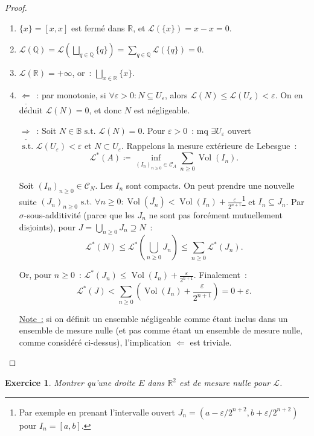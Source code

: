 \documentclass{article}
\newtheorem{ex}{Exercice}[section]
\newcommand{\pinfty}{{+\infty}}
\newcommand{\st}{\text{ s.t. }}
\newcommand{\Q}{{\mathbb Q}}
\newcommand{\R}{{\mathbb R}}
\newcommand{\B}{{\mathbb B}}
\DeclareMathOperator{\Vol}{Vol}
\begin{document}
\begin{proof}~
\begin{enumerate}
	\item $\{x\} = [x, x]$ est fermé dans $\R$, et $\mathcal L(\{x\}) = x-x = 0$.
	\item $\mathcal L(\Q) = \mathcal L(\bigsqcup_{q \in \Q}\{q\}) = \sum_{q \in \Q}\mathcal L(\{q\}) = 0$.
	\item $\mathcal L(\R) = \pinfty$, or~: $\bigsqcup_{x \in \R}\{x\}$.
	\item $\underline {\Leftarrow}$~: par monotonie, si $\forall \varepsilon > 0 : N \subseteq U_\varepsilon$, alors $\mathcal L(N) \leq \mathcal L(U_\varepsilon) < \varepsilon$.
	On en déduit $\mathcal L(N) = 0$, et donc $N$ est négligeable.

	$\underline {\Rightarrow}$~: Soit $N \in \B \st \mathcal L(N) = 0$. Pour $\varepsilon > 0$~: mq $\exists U_\varepsilon$ ouvert $\st \mathcal L(U_\varepsilon) < \varepsilon$
	et $N \subset U_\varepsilon$. Rappelons la mesure extérieure de Lebesgue~:
	\[\mathcal L^*(A) \coloneqq \inf_{(I_n)_{n \geq 0} \in \mathcal C_A}\sum_{n \geq 0}\Vol(I_n).\]

	Soit $(I_n)_{n \geq 0} \in \mathcal C_N$. Les $I_n$ sont compacts. On peut prendre une nouvelle suite $(J_n)_{n \geq 0} \st \forall n \geq 0 :
	\Vol(\overline {J_n}) < \Vol(I_n) + \frac \varepsilon{2^{n+1}}$\footnote{Par exemple en prenant l'intervalle ouvert $J_n = (a-\varepsilon/2^{n+2}, b+\varepsilon/2^{n+2})$
	pour $I_n = [a, b]$.} et $I_n \subseteq J_n$. Par $\sigma$-sous-additivité (parce que les $J_n$ ne sont pas forcément mutuellement disjoints),
	pour $J = \bigcup_{n \geq 0}J_n \supseteq N$~:
	\[\mathcal L^*(N) \leq \mathcal L^*(\bigcup_{n \geq 0}J_n) \leq \sum_{n \geq 0}\mathcal L^*(J_n).\]

	Or, pour $n \geq 0$~: $\mathcal L^*(J_n) \leq \Vol(I_n) + \frac \varepsilon{2^{n+1}}$. Finalement~:
	\[\mathcal L^*(J) < \sum_{n \geq 0}\left(\Vol(I_n) + \frac \varepsilon{2^{n+1}}\right) = 0 + \varepsilon.\]

	\underline {Note~:} si on définit un ensemble négligeable comme étant inclus dans un ensemble de mesure nulle (et pas comme étant un ensemble de mesure nulle, comme considéré
	ci-dessus), l'implication $\Leftarrow$ est triviale.
\end{enumerate}
\end{proof}

\begin{ex} Montrer qu'une droite $E$ dans $\R^2$ est de mesure nulle pour $\mathcal L$.
\end{ex}
\end{document}
